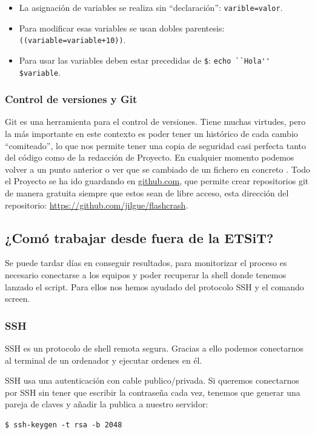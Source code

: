 \begin{itemize}

\item La asignación de variables se realiza sin ``declaración'': \verb|varible=valor|.
\item Para modificar esas variables se usan dobles parentesis: \verb|((variable=variable+10))|.
\item Para usar las variables deben estar precedidas de \verb|$|: \verb|echo ``Hola'' $variable|.

\end{itemize}

\subsubsection{Control de versiones y Git}
Git es una herramienta para el control de versiones. Tiene muchas virtudes, pero la más importante en este contexto es poder tener un histórico de cada cambio ``comiteado'', lo que nos permite tener una copia de seguridad casi perfecta tanto del código como de la redacción de Proyecto. En cualquier momento podemos volver a un punto anterior o ver que se cambiado de un fichero en concreto \cite{git-scm}. Todo el Proyecto se ha ido guardando en \url{github.com}, que permite crear repositorios git de manera gratuita siempre que estos sean de libre acceso, esta dirección del repositorio: \url{https://github.com/jilgue/flashcrash}.

\subsection{¿Comó trabajar desde fuera de la ETSiT?}
\label{subsec:ComoTrabajarDesdeFueraETSiT}
Se puede tardar días en conseguir resultados, para monitorizar el proceso es necesario conectarse a los equipos y poder recuperar la shell donde tenemos lanzado el script. Para ellos nos hemos ayudado del protocolo SSH y el comando screen.

\subsubsection{SSH}
SSH es un protocolo de shell remota segura. Gracias a ello podemos conectarnos al terminal de un ordenador y ejecutar ordenes en él. 

SSH usa una autenticación con cable publico/privada. Si queremos conectarnos por SSH sin tener que escribir la contraseña cada vez, tenemos que generar una pareja de claves y añadir la publica a nuestro servidor:
\begin{verbatim}
$ ssh-keygen -t rsa -b 2048
\end{verbatim}

